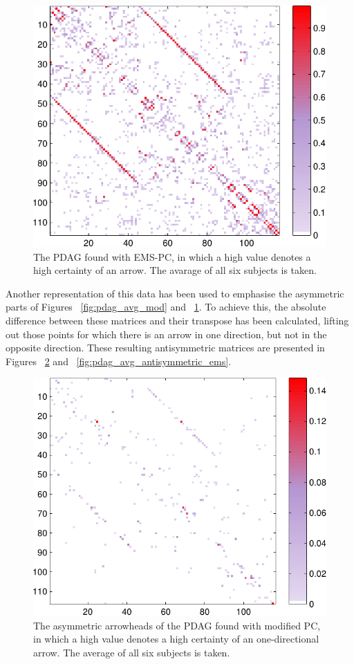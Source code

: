 \documentclass[a4paper, 10pt, english, onecolumn]{article}
\begin{document}
\begin{figure}[h!]
  \centering
  \includegraphics{images/PDAG_avg_colored_expl}
  \caption{The PDAG found with EMS-PC, in which a high value denotes a high certainty of an arrow. The avarage of all six subjects is taken.}
  \label{fig:pdag_avg_ems}
\end{figure}

Another representation of this data has been used to emphasise the asymmetric parts of Figures ~\ref{fig:pdag_avg_mod} and ~\ref{fig:pdag_avg_ems}.
To achieve this, the absolute difference between these matrices and their transpose has been calculated, lifting out those points for which there is an arrow in one direction, but not in the opposite direction.
These resulting antisymmetric matrices are presented in Figures ~\ref{fig:pdag_avg_antisymmetric_mod} and ~\ref{fig:pdag_avg_antisymmetric_ems}.

\begin{figure}[h!]
  \centering
  \includegraphics{images/arrowheads_avg_mod}
  \caption{The asymmetric arrowheads of the PDAG found with modified PC, in which a high value denotes a high certainty of an one-directional arrow. The average of all six subjects is taken.}
  \label{fig:pdag_avg_antisymmetric_mod}
\end{figure}
\end{document}
